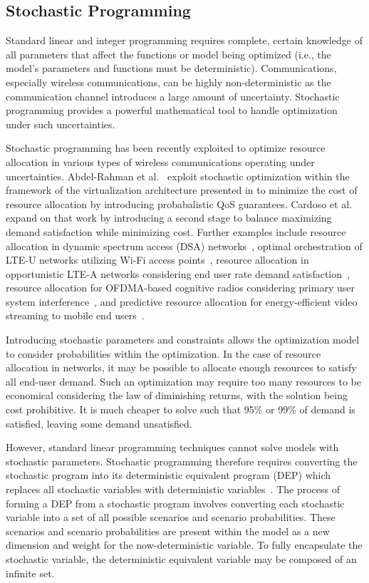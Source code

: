 \documentclass[12pt,dvipsnames]{report}
\begin{document}
\subsection{Stochastic Programming}	\label{subsec:optreview_stoch}

Standard linear and integer programming requires complete, certain knowledge of all parameters that affect the functions or model being optimized (i.e., the model's parameters and functions must be deterministic).  Communications, especially wireless communications, can be highly non-deterministic as the communication channel introduces a large amount of uncertainty.  Stochastic programming provides a powerful mathematical tool to handle optimization under such uncertainties.

Stochastic programming has been recently exploited to optimize resource allocation in various types of wireless communications operating under uncertainties.  Abdel-Rahman et al.~\cite{MJ_CCNC_16} exploit stochastic optimization within the framework of the virtualization architecture presented in  to minimize the cost of resource allocation by introducing probabalistic QoS guarantees.  Cardoso et al.~\cite{MJ_MECOMM_17} expand on that work by introducing a second stage to balance maximizing demand satisfaction while minimizing cost.  Further examples include resource allocation in dynamic spectrum access (DSA) networks~\cite{MJ_TW_13}, optimal orchestration of LTE-U networks utilizing Wi-Fi access points~\cite{MJ_WCNC_16}, resource allocation in opportunistic LTE-A networks considering end user rate demand satisfaction~\cite{MJ_DySPAN_15}, resource allocation for OFDMA-based cognitive radios considering primary user system interference~\cite{CC_OFDMA}, and predictive resource allocation for energy-efficient video streaming to mobile end users~\cite{CC_video}.

Introducing stochastic parameters and constraints allows the optimization model to consider probabilities within the optimization.  In the case of resource allocation in networks, it may be possible to allocate enough resources to satisfy all end-user demand.  Such an optimization may require too many resources to be economical considering the law of diminishing returns, with the solution being cost prohibitive.  It is much cheaper to solve such that 95\% or 99\% of demand is satisfied, leaving some demand unsatisfied.

However, standard linear programming techniques cannot solve models with stochastic parameters.  Stochastic programming therefore requires converting the stochastic program into its deterministic equivalent program (DEP) which replaces all stochastic variables with deterministic variables~\cite{stochprogramming}.  The process of forming a DEP from a stochastic program involves converting each stochastic variable into a set of all possible scenarios and scenario probabilities.  These scenarios and scenario probabilities are present within the model as a new dimension and weight for the now-deterministic variable.  To fully encapsulate the stochastic variable, the deterministic equivalent variable may be composed of an infinite set.
\end{document}
